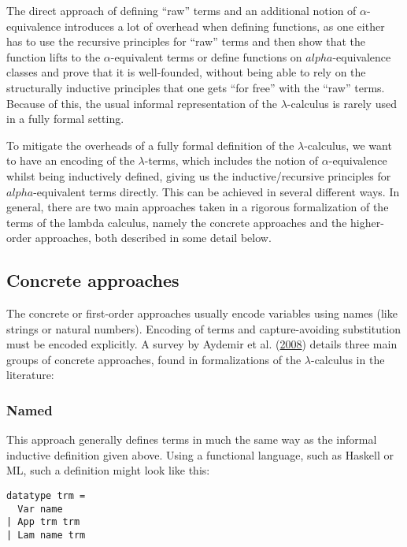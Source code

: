 \documentclass[a4paper, 12pt, twoside]{style/ociamthesis}
\begin{document}
The direct approach of defining ``raw'' terms and an additional notion
of \(\alpha\)-equivalence introduces a lot of overhead when defining
functions, as one either has to use the recursive principles for ``raw''
terms and then show that the function lifts to the \(\alpha\)-equivalent
terms or define functions on \(alpha\)-equivalence classes and prove
that it is well-founded, without being able to rely on the structurally
inductive principles that one gets ``for free'' with the ``raw''
terms.\\
Because of this, the usual informal representation of the
\(\lambda\)-calculus is rarely used in a fully formal setting.

To mitigate the overheads of a fully formal definition of the
\(\lambda\)-calculus, we want to have an encoding of the
\(\lambda\)-terms, which includes the notion of \(\alpha\)-equivalence
whilst being inductively defined, giving us the inductive/recursive
principles for \(alpha\)-equivalent terms directly. This can be achieved
in several different ways. In general, there are two main approaches
taken in a rigorous formalization of the terms of the lambda calculus,
namely the concrete approaches and the higher-order approaches, both
described in some detail below.

\subsection{Concrete approaches}\label{concrete-approaches}

The concrete or first-order approaches usually encode variables using
names (like strings or natural numbers). Encoding of terms and
capture-avoiding substitution must be encoded explicitly. A survey by
Aydemir et al. (\protect\hyperlink{ref-aydemir08}{2008}) details three
main groups of concrete approaches, found in formalizations of the
\(\lambda\)-calculus in the literature:

\subsubsection{Named}\label{named}

This approach generally defines terms in much the same way as the
informal inductive definition given above. Using a functional language,
such as Haskell or ML, such a definition might look like this:

\begin{verbatim}
datatype trm =
  Var name
| App trm trm
| Lam name trm
\end{verbatim}
\end{document}
